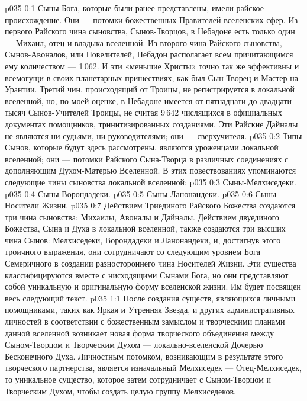 \author{Глава Архангелов}
\vs p035 0:1 Сыны Бога, которые были ранее представлены, имели райское происхождение. Они --- потомки божественных Правителей вселенских сфер. Из первого Райского чина сыновства, Сынов\hyp{}Творцов, в Небадоне есть только один --- Михаил, отец и владыка вселенной. Из второго чина Райского сыновства, Сынов\hyp{}Авоналов, или Повелителей, Небадон располагает всем причитающимся ему количеством --- 1\,062. И эти «меньшие Христы» точно так же эффективны и всемогущи в своих планетарных пришествиях, как был Сын\hyp{}Творец и Мастер на Урантии. Третий чин, происходящий от Троицы, не регистрируется в локальной вселенной, но, по моей оценке, в Небадоне имеется от пятнадцати до двадцати тысяч Сынов\hyp{}Учителей Троицы, не считая 9\,642 числящихся в официальных документах помощников, тринитизированных созданиями. Эти Райские Дайналы не являются ни судьями, ни руководителями; они --- сверхучителя.
\vs p035 0:2 Типы Сынов, которые будут здесь рассмотрены, являются уроженцами локальной вселенной; они --- потомки Райского Сына\hyp{}Творца в различных соединениях с дополняющим Духом\hyp{}Матерью Вселенной. В этих повествованиях упоминаются следующие чины сыновства локальной вселенной:
\vs p035 0:3 \bibnobreakspace Сыны\hyp{}Мелхиседеки.
\vs p035 0:4 \bibnobreakspace Сыны\hyp{}Ворондадеки.
\vs p035 0:5 \bibnobreakspace Сыны\hyp{}Ланонандеки.
\vs p035 0:6 \bibnobreakspace Сыны\hyp{}Носители Жизни.
\vs p035 0:7 \pc Действием Триединого Райского Божества создаются три чина сыновства: Михаилы, Авоналы и Дайналы. Действием двуединого Божества, Сына и Духа в локальной вселенной, также создаются три высших чина Сынов: Мелхиседеки, Ворондадеки и Ланонандеки, и, достигнув этого троичного выражения, они сотрудничают со следующим уровнем Бога Семеричного в создании разностороннего чина Носителей Жизни. Эти существа классифицируются вместе с нисходящими Сынами Бога, но они представляют собой уникальную и оригинальную форму вселенской жизни. Им будет посвящен весь следующий текст.
\vs p035 1:1 После создания существ, являющихся личными помощниками, таких как Яркая и Утренняя Звезда, и других административных личностей в соответствии с божественным замыслом и творческими планами данной вселенной возникает новая форма творческого объединения между Сыном\hyp{}Творцом и Творческим Духом --- локально\hyp{}вселенской Дочерью Бесконечного Духа. Личностным потомком, возникающим в результате этого творческого партнерства, является изначальный Мелхиседек --- Отец\hyp{}Мелхиседек, то уникальное существо, которое затем сотрудничает с Сыном\hyp{}Творцом и Творческим Духом, чтобы создать целую группу Мелхиседеков.
